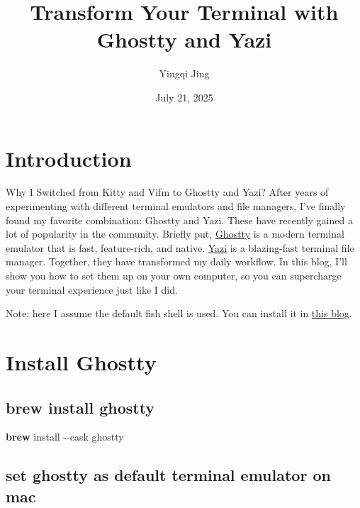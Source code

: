 \documentclass[
  letterpaper,
  DIV=11,
  numbers=noendperiod]{scrartcl}
\title{Transform Your Terminal with Ghostty and Yazi}
\author{Yingqi Jing}
\date{July 21, 2025}
\newenvironment{Shaded}{}{}
\newcommand{\AttributeTok}[1]{\textcolor[rgb]{0.65,0.15,0.64}{#1}}
\newcommand{\ExtensionTok}[1]{\textcolor[rgb]{0.25,0.47,0.95}{\textbf{#1}}}
\newcommand{\NormalTok}[1]{\textcolor[rgb]{0.22,0.23,0.26}{#1}}
\renewcommand*\contentsname{Table of contents}
\newcommand\contentsname{Table of contents}
\begin{document}
\maketitle

\renewcommand*\contentsname{Contents}
{
\hypersetup{linkcolor=}
\setcounter{tocdepth}{4}
\tableofcontents
}
\listoffigures
\listoftables

\clearpage

\section{Introduction}\label{introduction}

Why I Switched from Kitty and Vifm to Ghostty and Yazi? After years of
experimenting with different terminal emulators and file managers, I've
finally found my favorite combination: Ghostty and Yazi. These have
recently gained a lot of popularity in the community. Briefly put,
\href{https://github.com/ghostty-org/ghostty}{Ghostty} is a modern
terminal emulator that is fast, feature-rich, and native.
\href{https://github.com/sxyazi/yazi}{Yazi} is a blazing-fast terminal
file manager. Together, they have transformed my daily workflow. In this
blog, I'll show you how to set them up on your own computer, so you can
supercharge your terminal experience just like I did.

Note: here I assume the default fish shell is used. You can install it
in \href{https://medium.com/p/6f9610276c33}{this blog}.

\section{Install Ghostty}\label{install-ghostty}

\subsection{brew install ghostty}\label{brew-install-ghostty}

\begin{Shaded}
\begin{Highlighting}[]
\ExtensionTok{brew}\NormalTok{ install }\AttributeTok{{-}{-}cask}\NormalTok{ ghostty}
\end{Highlighting}
\end{Shaded}

\subsection{set ghostty as default terminal emulator on
mac}\label{set-ghostty-as-default-terminal-emulator-on-mac}
\end{document}
